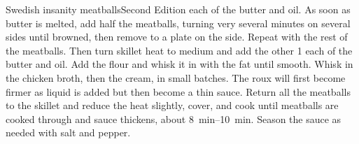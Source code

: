 \begin{entry}{Swedish insanity meatballs}{Second Edition}
each of the butter and oil. As soon as butter is melted, add half the
meatballs, turning very several minutes on several sides until browned, then
remove to a plate on the side. Repeat with the rest of the meatballs. Then
turn skillet heat to medium and add the other \SI{1}{\tblspoon} each of the
butter and oil. Add the flour and whisk it in with the fat until smooth. Whisk
in the chicken broth, then the cream, in small batches. The roux will first
become firmer as liquid is added but then become a thin sauce. Return all the
meatballs to the skillet and reduce the heat slightly, cover, and cook until
meatballs are cooked through and sauce thickens, about
\SIrange{8}{10}{\minute}. Season the sauce as needed with salt and pepper.
\end{entry}


